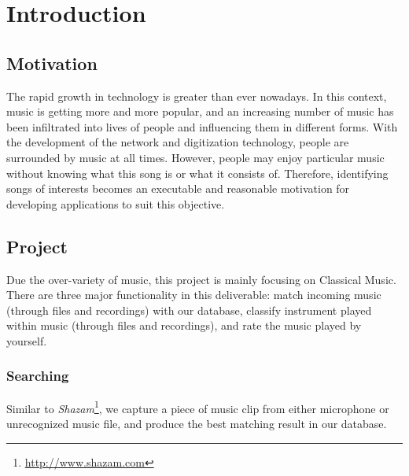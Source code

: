 \documentclass[whitelogo,12pt]{tudelft-report}
\begin{document}
\let\cleardoublepage\clearpage

%

\tableofcontents

\mainmatter

%
%

\chapter{Introduction}
\section{Motivation}
The rapid growth in technology is greater than ever nowadays. In this context, music is getting more and more popular, and an increasing number of music has been infiltrated into lives of people and influencing them in different forms. With the development of the network and digitization technology, people are surrounded by music at all times. However, people may enjoy particular music without knowing what this song is or what it consists of. Therefore, identifying songs of interests becomes an executable and reasonable motivation for developing applications to suit this objective.

\section{Project} \label{project}
Due the over-variety of music, this project is mainly focusing on Classical Music. There are three major functionality in this deliverable: match incoming music (through files and recordings) with our database, classify instrument played within music (through files and recordings), and rate the music played by yourself.

\subsection{Searching}
Similar to \textit{Shazam}\footnote{\url{http://www.shazam.com}}, we capture a piece of music clip from either microphone or unrecognized music file, and produce the best matching result in our database.
\end{document}
